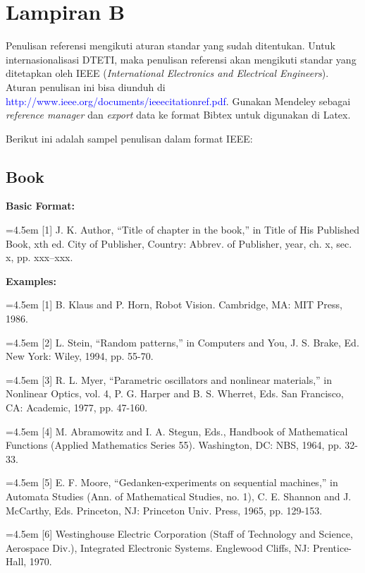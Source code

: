 \chapter*{Lampiran B}

Penulisan referensi mengikuti aturan standar yang sudah ditentukan. Untuk 
internasionalisasi DTETI, maka penulisan referensi akan mengikuti standar yang 
ditetapkan oleh IEEE (\textit{International Electronics and Electrical Engineers}). Aturan penulisan ini bisa diunduh di \textcolor{blue}{http://www.ieee.org/documents/ieeecitationref.pdf}. Gunakan Mendeley sebagai \textit{reference manager} dan \textit{export} data ke format Bibtex untuk digunakan di Latex.

Berikut ini adalah sampel penulisan dalam format IEEE:

\section*{Book}

\textbf{Basic Format:}

\hangindent=4.5em
[1] J. K. Author, “Title of chapter in the book,” in Title of His Published Book, xth ed. City of Publisher, Country: Abbrev. of Publisher, year, ch. x, sec. x, pp. xxx–xxx.

\textbf{Examples:}

\hangindent=4.5em 
[1] B. Klaus and P. Horn, Robot Vision. Cambridge, MA: MIT Press, 1986.

\hangindent=4.5em 
[2] L. Stein, “Random patterns,” in Computers and You, J. S. Brake, Ed. New York: Wiley, 1994, pp. 55-70.

\hangindent=4.5em 
[3] R. L. Myer, “Parametric oscillators and nonlinear materials,” in Nonlinear Optics, vol. 4, P. G. Harper and B. S. Wherret, Eds. San Francisco, CA: Academic, 1977, pp. 47-160.

\hangindent=4.5em 
[4] M. Abramowitz and I. A. Stegun, Eds., Handbook of Mathematical Functions (Applied Mathematics Series 55). Washington, DC: NBS, 1964, pp. 32-33.

\hangindent=4.5em 
[5] E. F. Moore, “Gedanken-experiments on sequential machines,” in Automata Studies 
(Ann. of Mathematical Studies, no. 1), C. E. Shannon and J. McCarthy, Eds. Princeton, NJ: Princeton Univ. Press, 1965, pp. 129-153.

\hangindent=4.5em 
[6] Westinghouse Electric Corporation (Staff of Technology and Science, Aerospace Div.), Integrated Electronic Systems. Englewood Cliffs, NJ: Prentice-Hall, 1970.

